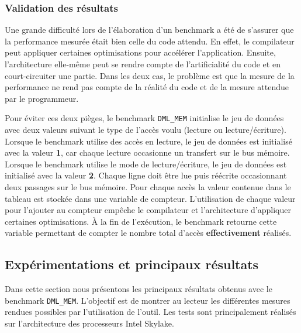     
    \subsubsection{Validation des résultats} \label{sec:dml_init}

    Une grande difficulté lors de l'élaboration d'un benchmark a été de s'assurer que la performance mesurée était bien celle du code attendu. En effet, le compilateur peut appliquer certaines optimisations pour accélérer l'application. Ensuite, l'architecture elle-même peut se rendre compte de l'artificialité du code et en court-circuiter une partie. Dans les deux cas, le problème est que la mesure de la performance ne rend pas compte de la réalité du code et de la mesure attendue par le programmeur. 
    
    Pour éviter ces deux pièges, le benchmark \verb=DML_MEM= initialise le jeu de données avec deux valeurs suivant le type de l'accès voulu (lecture ou lecture/écriture). Lorsque le benchmark utilise des accès en lecture, le jeu de données est initialisé avec la valeur \textbf{1}, car chaque lecture occasionne un transfert sur le bus mémoire. 
    Lorsque le benchmark utilise le mode de lecture/écriture, le jeu de données est initialisé avec la valeur \textbf{2}. Chaque ligne doit être lue puis réécrite occasionnant deux passages sur le bus mémoire. Pour chaque accès la valeur contenue dans le tableau est stockée dans une variable de compteur.  L'utilisation de chaque valeur pour l'ajouter au compteur empêche le compilateur et l'architecture d'appliquer certaines optimisations. À la fin de l'exécution, le benchmark retourne cette variable permettant de compter le nombre total d'accès \textbf{effectivement} réalisés.
    

    
    
    
    
    
    
    
    
\subsection{Expérimentations et principaux résultats}

    Dans cette section nous présentons les principaux résultats obtenus avec le benchmark \verb=DML_MEM=. L'objectif est de montrer au lecteur les différentes mesures rendues possibles par l'utilisation de l'outil. Les tests sont principalement réalisés sur l'architecture des processeurs Intel Skylake. 


